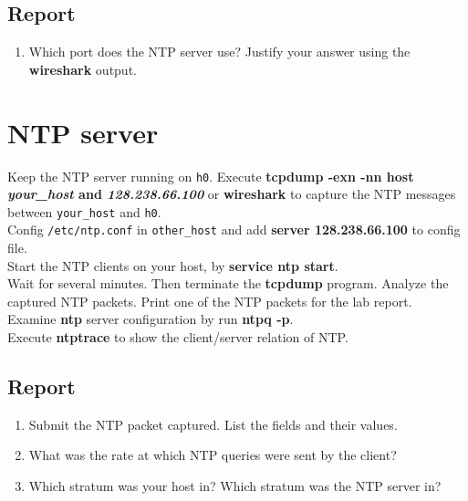 \documentclass[10pt,a4paper]{article}
\numberwithin{equation}{section}
\numberwithin{figure}{section}
\numberwithin{table}{section}
\begin{document}
    \subsection*{Report}
    \begin{enumerate}
        \item Which port does the NTP server use?
        Justify your answer using the \textbf{wireshark} output.
    \end{enumerate}

\section{NTP server}
    Keep the NTP server running on \texttt{h0}. Execute \textbf{tcpdump -exn -nn host \textit{your\_host} and \textit{128.238.66.100}} or \textbf{wireshark} to capture the NTP messages between \texttt{your\_host} and \texttt{h0}.\\
    Config \texttt{/etc/ntp.conf} in \texttt{other\_host} and add \textbf{server 128.238.66.100} to config file.\\
    Start the NTP clients on your host, by \textbf{service ntp start}.\\
    Wait for several minutes. Then terminate the \textbf{tcpdump} program. Analyze the captured NTP packets. Print one of the NTP packets for the lab report.\\
    Examine \textbf{ntp} server configuration by run \textbf{ntpq -p}.\\
    Execute \textbf{ntptrace} to show the client/server relation of NTP.\\

    \subsection*{Report}
    \begin{enumerate}
        \item Submit the NTP packet captured. List the fields and their values.
        \item What was the rate at which NTP queries were sent by the client?
        \item Which stratum was your host in? Which stratum was the NTP server in?
    \end{enumerate}
\end{document}
